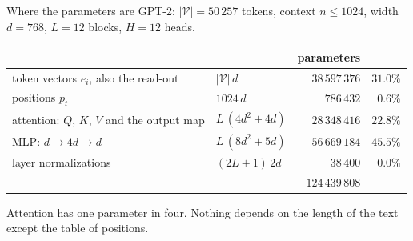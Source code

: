 \documentclass[10pt]{beamer}
\newcommand{\Vocab}{\mathcal{V}}   %
\newcommand{\ctrl}[1]{\textcolor{ctrl}{#1}}
\begin{document}
\begin{frame}{Where the parameters are}
\small
GPT-2: $|\Vocab|=50\,257$ tokens, context $n\le1024$, width $d=768$, $L=12$ blocks, $H=12$ heads.

\medskip
{\centering
\renewcommand{\arraystretch}{1.15}
\setlength{\tabcolsep}{5pt}
\begin{tabular}{@{}l l r r@{}}
\toprule
 & & \textbf{parameters} & \\
\midrule
token vectors $e_i$, also the read-out & $|\Vocab|\,d$ & $38\,597\,376$ & $31.0\%$ \\
positions $p_t$ & $1024\,d$ & $786\,432$ & $0.6\%$ \\
attention: $Q$, $K$, $V$ and the output map & $L\,(4d^2+4d)$ & $28\,348\,416$ & $22.8\%$ \\
\ctrl{MLP}: $d\to4d\to d$ & $L\,(8d^2+5d)$ & \ctrl{$56\,669\,184$} & \ctrl{$45.5\%$} \\
layer normalizations & $(2L+1)\,2d$ & $38\,400$ & $0.0\%$ \\
\midrule
 & & $124\,439\,808$ & \\
\bottomrule
\end{tabular}\par}

\medskip
\centering
{}

\medskip
\raggedright
Attention has one parameter in four. \alert{Nothing depends on the length of the text} except the table of positions.
\end{frame}
\end{document}
